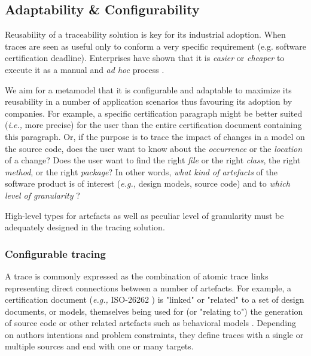 \subsection{Adaptability \& Configurability}
Reusability of a traceability solution is key for its industrial adoption. When traces are seen as useful only to conform a very specific requirement (e.g. software certification deadline). Enterprises have shown that it is \textit{easier} or \textit{cheaper} to execute it as a manual and \textit{ad hoc} process \cite{clelandhuang2014-traceability-trends-and-futurte-direction}.

We aim for a metamodel that it is configurable and adaptable to maximize its reusability in a number of application scenarios thus favouring its adoption by companies. For example, a specific certification paragraph might be better suited (\textit{i.e.,} more precise) for the user than the entire certification document containing this paragraph. Or, if the purpose is to trace the impact of changes in a model on the source code, does the user want to know about the \textit{occurrence} or the \textit{location} of a change? Does the user want to find the right \textit{file} or the right \textit{class}, the right \textit{method}, or the right \textit{package}?
In other words, \textit{what kind of artefacts} of the software product is of interest (\textit{e.g.,} design models, source code) and to \textit{which level of granularity} ? 

High-level types for artefacts as well as peculiar level of granularity must be adequately designed in the tracing solution.

\subsubsection{Configurable tracing} 
A trace is commonly expressed as the combination of atomic trace links representing direct connections between a number of artefacts. For example, a certification document (\textit{e.g.,} ISO-26262 \cite{iso26262}) is "linked" or "related" to a set of design documents, or models, themselves being used for (or "relating to") the generation of source code or other related artefacts such as behavioral models \cite{lorenzoli2008-automatic-generation-of-software-behavioral-model}. Depending on authors intentions and problem constraints, they define traces with a single or multiple sources and end with one or many targets.  

